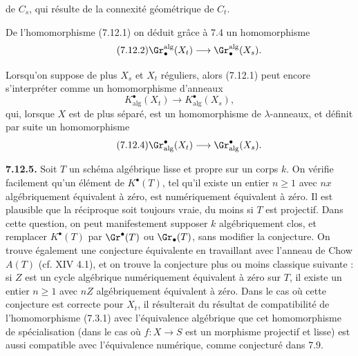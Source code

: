 
de \(C_s\), qui résulte de la connexité géométrique de \(C_t\).

De l'homomorphisme (7.12.1) on déduit grâce à 7.4 un homomorphisme
\begin{equation}\tag{7.12.2}
  \Gr_\bullet^{\mathrm{alg}}(X_t)\longrightarrow \Gr_\bullet^{\mathrm{alg}}(X_s).
\end{equation}

Lorsqu'on suppose de plus \(X_s\) et \(X_t\) réguliers, alors (7.12.1) peut encore s'interpréter comme un homomorphisme d'anneaux
\begin{equation}\tag{7.12.3}
  K^\bullet_{\mathrm{alg}}(X_t)\longrightarrow K^\bullet_{\mathrm{alg}}(X_s),
\end{equation}
qui, lorsque \(X\) est de plus séparé, est un homomorphisme de \(\lambda\)-anneaux, et définit par suite un homomorphisme
\begin{equation}\tag{7.12.4}
  \Gr^\bullet_{\mathrm{alg}}(X_t)\longrightarrow \Gr^\bullet_{\mathrm{alg}}(X_s).
\end{equation}

\textbf{7.12.5.} Soit \(T\) un schéma algébrique lisse et propre sur un corps \(k\). On vérifie facilement qu'un élément de \(K^\bullet(T)\), tel qu'il existe un entier \(n\geq1\) avec \(nx\) algébriquement équivalent à zéro, est numériquement équivalent à zéro. Il est plausible que la réciproque soit toujours vraie, du moins si \(T\) est projectif. Dans cette question, on peut manifestement supposer \(k\) algébriquement clos, et remplacer \(K^\bullet(T)\) par \(\Gr^\bullet(T)\) ou \(\Gr_\bullet(T)\), sans modifier la conjecture. On trouve également une conjecture équivalente en travaillant avec l'anneau de Chow \(A(T)\) (cf. XIV 4.1), et on trouve la conjecture plus ou moins classique suivante : si \(Z\) est un cycle algébrique numériquement équivalent à zéro sur \(T\), il existe un entier \(n\geq1\) avec \(nZ\) algébriquement équivalent à zéro. Dans le cas où cette conjecture est correcte pour \(X_t\), il résulterait du résultat de compatibilité de l'homomorphisme (7.3.1) avec l'équivalence algébrique que cet homomorphisme de spécialisation (dans le cas où \(f:X\to S\) est un morphisme projectif et lisse) est aussi compatible avec l'équivalence numérique, comme conjecturé dans 7.9.


